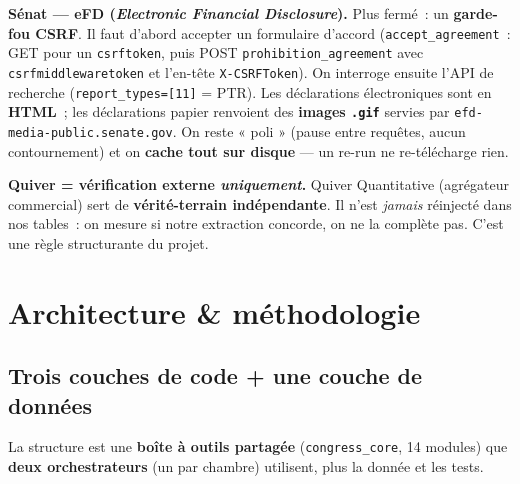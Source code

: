 \documentclass[11pt,a4paper]{article}
\newcommand{\co}[1]{\texttt{\small #1}}
\begin{document}
\textbf{Sénat — eFD (\emph{Electronic Financial Disclosure}).} Plus fermé~: un \textbf{garde-fou CSRF}.
Il faut d'abord accepter un formulaire d'accord (\co{accept_agreement}~: GET pour un \co{csrftoken},
puis POST \co{prohibition_agreement} avec \co{csrfmiddlewaretoken} et l'en-tête \co{X-CSRFToken}). On
interroge ensuite l'API de recherche (\co{report_types=[11]} = PTR). Les déclarations électroniques
sont en \textbf{HTML}~; les déclarations papier renvoient des \textbf{images \co{.gif}} servies par
\co{efd-media-public.senate.gov}. On reste « poli » (pause entre requêtes, aucun contournement) et on
\textbf{cache tout sur disque} — un re-run ne re-télécharge rien.

\textbf{Quiver = vérification externe \emph{uniquement}.} Quiver Quantitative (agrégateur commercial)
sert de \textbf{vérité-terrain indépendante}. Il n'est \emph{jamais} réinjecté dans nos tables~: on
mesure si notre extraction concorde, on ne la complète pas. C'est une règle structurante du projet.

\section{Architecture \& méthodologie}
\label{sec:archi}

\subsection{Trois couches de code + une couche de données}
La structure est une \textbf{boîte à outils partagée} (\co{congress_core}, 14 modules) que
\textbf{deux orchestrateurs} (un par chambre) utilisent, plus la donnée et les tests.
\end{document}
